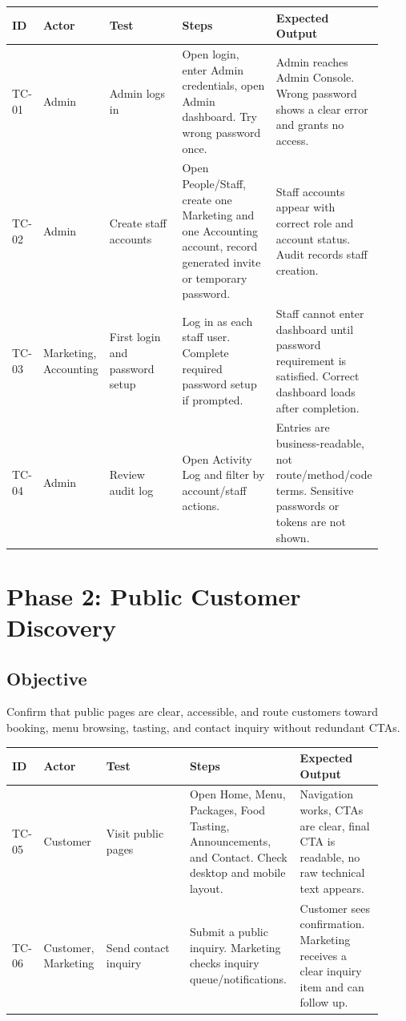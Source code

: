 \documentclass[11pt,a4paper]{article}
\begin{document}
\begin{longtable}{p{0.07\linewidth}p{0.13\linewidth}p{0.22\linewidth}p{0.28\linewidth}p{0.22\linewidth}}
\toprule
\textbf{ID} & \textbf{Actor} & \textbf{Test} & \textbf{Steps} & \textbf{Expected Output} \\
\midrule
TC-01 & Admin & Admin logs in & Open login, enter Admin credentials, open Admin dashboard. Try wrong password once. & Admin reaches Admin Console. Wrong password shows a clear error and grants no access. \\
TC-02 & Admin & Create staff accounts & Open People/Staff, create one Marketing and one Accounting account, record generated invite or temporary password. & Staff accounts appear with correct role and account status. Audit records staff creation. \\
TC-03 & Marketing, Accounting & First login and password setup & Log in as each staff user. Complete required password setup if prompted. & Staff cannot enter dashboard until password requirement is satisfied. Correct dashboard loads after completion. \\
TC-04 & Admin & Review audit log & Open Activity Log and filter by account/staff actions. & Entries are business-readable, not route/method/code terms. Sensitive passwords or tokens are not shown. \\
\bottomrule
\end{longtable}

\section{Phase 2: Public Customer Discovery}
\subsection{Objective}
Confirm that public pages are clear, accessible, and route customers toward booking, menu browsing, tasting, and contact inquiry without redundant CTAs.

\begin{longtable}{p{0.07\linewidth}p{0.13\linewidth}p{0.22\linewidth}p{0.28\linewidth}p{0.22\linewidth}}
\toprule
\textbf{ID} & \textbf{Actor} & \textbf{Test} & \textbf{Steps} & \textbf{Expected Output} \\
\midrule
TC-05 & Customer & Visit public pages & Open Home, Menu, Packages, Food Tasting, Announcements, and Contact. Check desktop and mobile layout. & Navigation works, CTAs are clear, final CTA is readable, no raw technical text appears. \\
TC-06 & Customer, Marketing & Send contact inquiry & Submit a public inquiry. Marketing checks inquiry queue/notifications. & Customer sees confirmation. Marketing receives a clear inquiry item and can follow up. \\
\bottomrule
\end{longtable}
\end{document}
